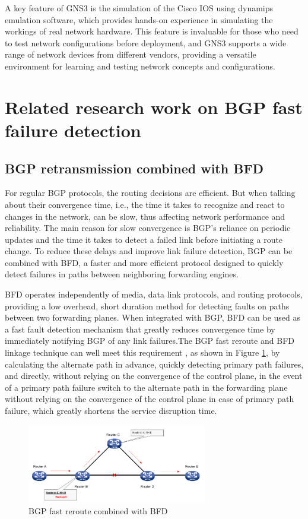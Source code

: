 \documentclass[12pt]{article}
\begin{document}
A key feature of GNS3 is the simulation of the Cisco IOS using dynamips emulation software, which provides hands-on experience in simulating the workings of real network hardware. This feature is invaluable for those who need to test network configurations before deployment, and GNS3 supports a wide range of network devices from different vendors, providing a versatile environment for learning and testing network concepts and configurations.

\newpage
\section{Related research work on BGP fast failure detection}
\subsection{BGP retransmission combined with BFD}
For regular BGP protocols, the routing decisions are efficient. But when talking about their convergence time, i.e., the time it takes to recognize and react to changes in the network, can be slow, thus affecting network performance and reliability. The main reason for slow convergence is BGP's reliance on periodic updates and the time it takes to detect a failed link before initiating a route change. To reduce these delays and improve link failure detection, BGP can be combined with BFD, a faster and more efficient protocol designed to quickly detect failures in paths between neighboring forwarding engines.

BFD operates independently of media, data link protocols, and routing protocols, providing a low overhead, short duration method for detecting faults on paths between two forwarding planes. When integrated with BGP, BFD can be used as a fast fault detection mechanism that greatly reduces convergence time by immediately notifying BGP of any link failures.The BGP fast reroute and BFD linkage technique can well meet this requirement \cite{ref7}, as shown in Figure \ref{fig:BGP fast reroute combined with BFD}, by calculating the alternate path in advance, quickly detecting primary path failures, and directly, without relying on the convergence of the control plane, in the event of a primary path failure switch to the alternate path in the forwarding plane without relying on the convergence of the control plane in case of primary path failure, which greatly shortens the service disruption time.

\begin{figure}[h]
    \centering
    \includegraphics[width=0.7\textwidth]{Graph/BGP fast reroute and BFD.png}
    \caption{BGP fast reroute combined with BFD \cite{ref7}} 
    \label{fig:BGP fast reroute combined with BFD} 
    
\end{figure}
\end{document}
